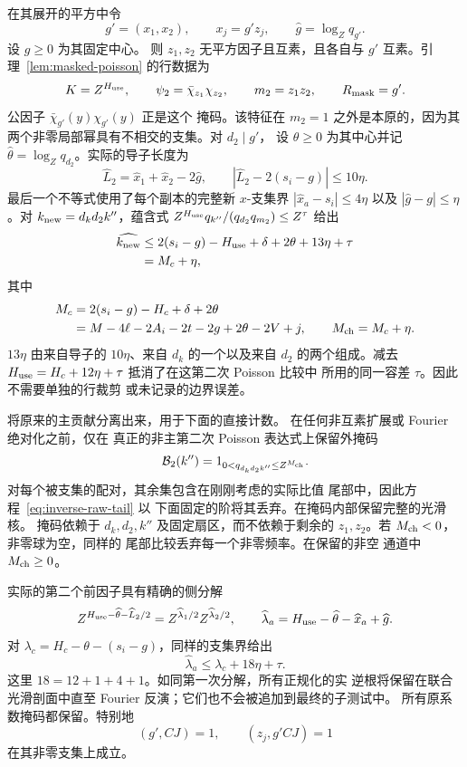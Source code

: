 在其展开的平方中令
\[
 g'=(x_1,x_2),\qquad x_j=g'z_j,\qquad
 \widehat g=\log_Zq_{g'}.
\]
设 \(g\ge0\) 为其固定中心。
则 \(z_1,z_2\) 无平方因子且互素，且各自与
\(g'\) 互素。引理~\ref{lem:masked-poisson} 的行数据为
\begin{equation}\label{eq:second-masked-data}
 K=Z^{H_{\rm use}},\qquad
 \psi_2=\bar\chi_{z_1}\chi_{z_2},\qquad
 m_2=z_1z_2,\qquad R_{\rm mask}=g'.
\end{equation}
公因子 \(\bar\chi_{g'}(y)\chi_{g'}(y)\) 正是这个
掩码。该特征在 \(m_2=1\) 之外是本原的，因为其
两个非零局部幂具有不相交的支集。对 \(d_2\mid g'\)，
设 \(\theta\ge0\) 为其中心并记
\(\widehat\theta=\log_Zq_{d_2}\)。实际的导子长度为
\[
 \widehat L_2=\widehat x_1+\widehat x_2-2\widehat g,
 \qquad |\widehat L_2-2(s_i-g)|\le10\eta.
\]
最后一个不等式使用了每个副本的完整新 \(x\)-支集界
\(|\widehat x_a-s_i|\le4\eta\) 以及
\(|\widehat g-g|\le\eta\)。对 \(k_{\rm new}=d_kd_2k''\)，蕴含式
\(Z^{H_{\rm use}}q_{k''}/(q_{d_2}q_{m_2})\le Z^\tau\) 给出
\[
 \begin{split}
 \widehat{k_{\rm new}}
 &\le2(s_i-g)-H_{\rm use}+\delta+2\theta+13\eta+\tau\\
 &=M_c+\eta,
 \end{split}
\]
其中
\begin{equation}\label{eq:second-poisson-lengths}
 \begin{split}
 M_c&=2(s_i-g)-H_c+\delta+2\theta\\
    &=M-4\ell-2A_i-2t-2g+2\theta-2V+j,\qquad
 M_{\rm ch}=M_c+\eta.
 \end{split}
\end{equation}
\(13\eta\) 由来自导子的 \(10\eta\)、来自
\(d_k\) 的一个以及来自 \(d_2\) 的两个组成。减去
\(H_{\rm use}=H_c+12\eta+\tau\) 抵消了在这第二次 Poisson 比较中
所用的同一容差 \(\tau\)。因此不需要单独的行裁剪
或未记录的边界误差。

将原来的主贡献分离出来，用于下面的直接计数。
在任何非互素扩展或 Fourier 绝对化之前，仅在
真正的非主第二次 Poisson 表达式上保留外掩码
\[
 \mathcal B_2(k'')=1_{0<q_{d_kd_2k''}\le Z^{M_{\rm ch}}}.
\]
对每个被支集的配对，其余集包含在刚刚考虑的实际比值
尾部中，因此方程~\eqref{eq:inverse-raw-tail} 以
下面固定的阶将其丢弃。在掩码内部保留完整的光滑核。
掩码依赖于 \(d_k,d_2,k''\) 及固定扇区，而不依赖于剩余的
\(z_1,z_2\)。若 \(M_{\rm ch}<0\)，非零球为空，同样的
尾部比较丢弃每一个非零频率。在保留的非空
通道中 \(M_{\rm ch}\ge0\)。

实际的第二个前因子具有精确的侧分解
\[
 Z^{H_{\rm use}-\widehat\theta-\widehat L_2/2}
       =Z^{\widehat\lambda_1/2}Z^{\widehat\lambda_2/2},
 \qquad \widehat\lambda_a=H_{\rm use}-\widehat\theta-\widehat x_a+
                           \widehat g.
\]
对 \(\lambda_c=H_c-\theta-(s_i-g)\)，同样的支集界给出
\begin{equation}\label{eq:inverse-second-prefactor-error}
 \widehat\lambda_a\le\lambda_c+18\eta+\tau.
\end{equation}
这里 \(18=12+1+4+1\)。如同第一次分解，所有正规化的实
逆根将保留在联合光滑剖面中直至 Fourier
反演；它们也不会被追加到最终的子测试中。
所有原系数掩码都保留。特别地
\[
 (g',CJ)=1,\qquad (z_j,g'CJ)=1
\]
在其非零支集上成立。

